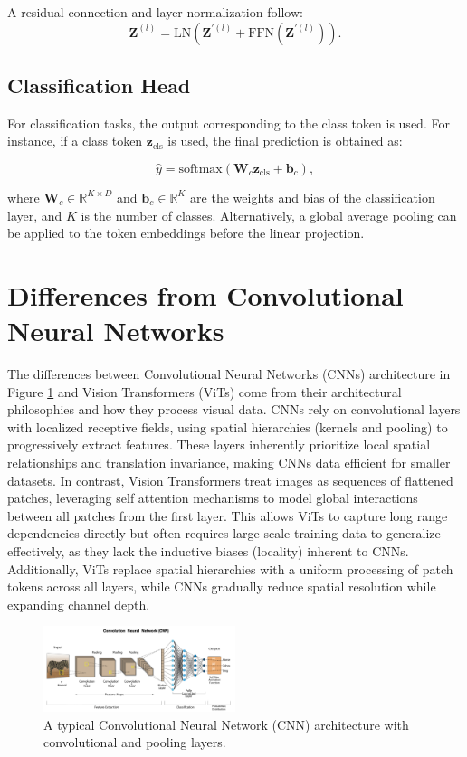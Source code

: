 A residual connection and layer normalization follow:
\begin{equation}
  \mathbf{Z}^{(l)} = \text{LN}\left(\mathbf{Z}^{\prime(l)} + \text{FFN}(\mathbf{Z}^{\prime(l)})\right).
\end{equation}

\subsection{Classification Head}

For classification tasks, the output corresponding to the class token is used. For instance, if a class token \(\mathbf{z}_{\text{cls}}\) is used, the final prediction is obtained as:

\begin{equation}
  \hat{y} = \text{softmax}\left(\mathbf{W}_c \mathbf{z}_{\text{cls}} + \mathbf{b}_c\right),
\end{equation}

where \(\mathbf{W}_c \in \mathbb{R}^{K \times D}\) and \(\mathbf{b}_c \in \mathbb{R}^{K}\) are the weights and bias of the classification layer, and \(K\) is the number of classes. Alternatively, a global average pooling can be applied to the token embeddings before the linear projection.


\section{Differences from Convolutional Neural Networks}
The differences between Convolutional Neural Networks (CNNs) architecture in Figure \ref{fig:cnn-arch} and Vision Transformers (ViTs) come from their architectural philosophies and how they process visual data. CNNs rely on convolutional layers with localized receptive fields, using spatial hierarchies (kernels and pooling) to progressively extract features. These layers inherently prioritize local spatial relationships and translation invariance, making CNNs data efficient for smaller datasets. In contrast, Vision Transformers treat images as sequences of flattened patches, leveraging self attention mechanisms to model global interactions between all patches from the first layer. This allows ViTs to capture long range dependencies directly but often requires large scale training data to generalize effectively, as they lack the inductive biases (locality) inherent to CNNs. Additionally, ViTs replace spatial hierarchies with a uniform processing of patch tokens across all layers, while CNNs gradually reduce spatial resolution while expanding channel depth.

\begin{figure}[H]
    \centering
    \includegraphics[width=0.5\textwidth]{images/cnn_architecture.png}
    \caption{A typical Convolutional Neural Network (CNN) architecture with convolutional and pooling layers.}
    \label{fig:cnn-arch}
\end{figure}